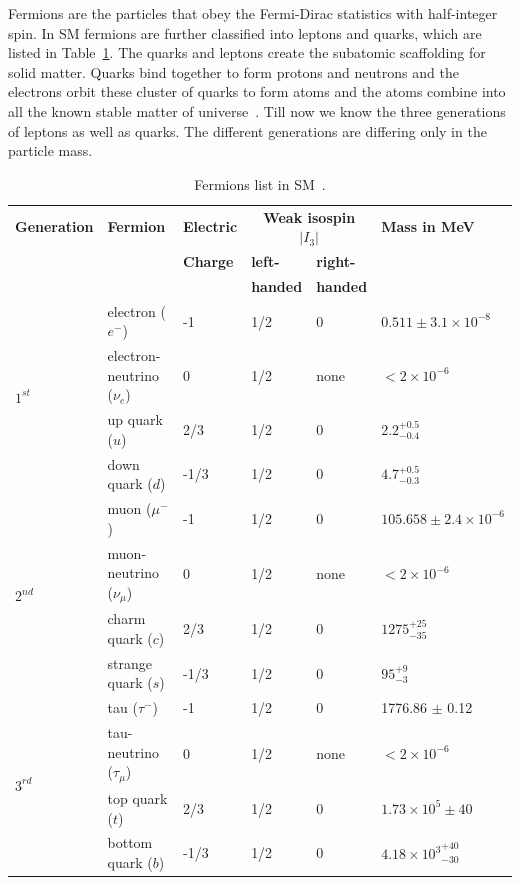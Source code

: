 Fermions are the particles that obey the Fermi-Dirac statistics with half-integer spin.
In SM fermions are further classified into leptons and quarks, which are listed in Table~\ref{table:smfermions}.
The quarks and leptons create the subatomic scaffolding for solid matter.
Quarks bind together to form protons and neutrons and the electrons orbit these cluster of quarks to form atoms and the atoms combine into all the known stable matter of universe~\cite{SM-buildingblock_uslhc}.
Till now we know the three generations of leptons as well as quarks. The different generations are differing only in the particle mass.
\begin{table}
\centering
\begin{tabular}[!htbp]{l l l l l l}
\hline
{\textbf{Generation}} & {\textbf{Fermion}} & {\textbf{Electric}} & \multicolumn{2}{c}{\textbf{Weak isospin $|I_3|$}} & \textbf{Mass in MeV} \\
    &           &    \textbf{Charge}  & \textbf{left-} & \textbf{right-} &     \\
    &           &                     & \textbf{handed} & \textbf{handed} &    \\
\hline
\multirow{4}{*}{$1^{st}$} & electron ($e^-$)           &   -1 & 1/2 &  0    &   $0.511\pm 3.1\times 10^{-8}$ \\
         & electron-neutrino ($\nu_e$)&   0  & 1/2 &  none &   $<2 \times 10^{-6}$   \\
         & up quark ($u$)             &  2/3 & 1/2 &  0    &   $2.2^{+0.5}_{-0.4}$  \\
         & down quark ($d$)           & -1/3 & 1/2 &  0    &   $4.7^{+0.5}_{-0.3}$  \\
\hline
\multirow{4}{*}{$2^{nd}$} & muon ($\mu^-$)             &  -1  & 1/2 &  0    &   $105.658 \pm 2.4 \times 10^{-6}$ \\
         & muon-neutrino ($\nu_{\mu}$)& 0    & 1/2 &  none &   $<2 \times 10^{-6}$   \\
         & charm quark ($c$)                & 2/3  & 1/2 &  0    &   $1275^{+25}_{-35}$     \\
         & strange quark ($s$)              & -1/3 & 1/2 &  0    &   $95^{+9}_{-3}$       \\
\hline
\multirow{4}{*}{$3^{rd}$} & tau ($\tau^-$)             & -1   & 1/2 &  0    &    1776.86 $\pm$ 0.12    \\
         & tau-neutrino ($\tau_{\mu}$)& 0    & 1/2 &  none &   $<2 \times 10^{-6}$   \\
         & top quark ($t$)                  & 2/3  & 1/2 &  0    &   $1.73\times 10^5\pm 40$\\
         & bottom quark ($b$)               & -1/3 & 1/2 &  0    &   ${4.18 \times 10^{3}}^{+40}_{-30}$\\
\hline
\end{tabular}
\caption{Fermions list in SM~\cite{PDG2018}.}
\label{table:smfermions}
\end{table}

